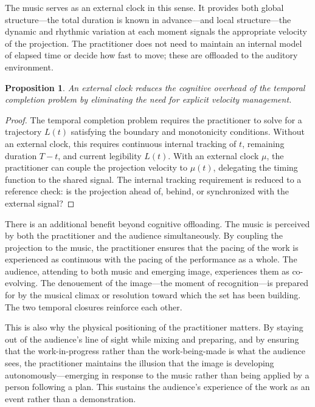 \documentclass[11pt, twoside]{article}
\theoremstyle{plain}
\newtheorem{proposition}[theorem]{Proposition}
\theoremstyle{definition}
\theoremstyle{remark}
\begin{document}
The music serves as an external clock in this sense. It provides both global structure---the total duration is known in advance---and local structure---the dynamic and rhythmic variation at each moment signals the appropriate velocity of the projection. The practitioner does not need to maintain an internal model of elapsed time or decide how fast to move; these are offloaded to the auditory environment.

\begin{proposition}
\label{prop:music-clock}
An external clock reduces the cognitive overhead of the temporal completion problem by eliminating the need for explicit velocity management.
\end{proposition}

\begin{proof}
The temporal completion problem requires the practitioner to solve for a trajectory $L(t)$ satisfying the boundary and monotonicity conditions. Without an external clock, this requires continuous internal tracking of $t$, remaining duration $T - t$, and current legibility $L(t)$. With an external clock $\mu$, the practitioner can couple the projection velocity to $\mu(t)$, delegating the timing function to the shared signal. The internal tracking requirement is reduced to a reference check: is the projection ahead of, behind, or synchronized with the external signal?
\end{proof}

There is an additional benefit beyond cognitive offloading. The music is perceived by both the practitioner and the audience simultaneously. By coupling the projection to the music, the practitioner ensures that the pacing of the work is experienced as continuous with the pacing of the performance as a whole. The audience, attending to both music and emerging image, experiences them as co-evolving. The denouement of the image---the moment of recognition---is prepared for by the musical climax or resolution toward which the set has been building. The two temporal closures reinforce each other.

This is also why the physical positioning of the practitioner matters. By staying out of the audience's line of sight while mixing and preparing, and by ensuring that the work-in-progress rather than the work-being-made is what the audience sees, the practitioner maintains the illusion that the image is developing autonomously---emerging in response to the music rather than being applied by a person following a plan. This sustains the audience's experience of the work as an event rather than a demonstration.
\end{document}
